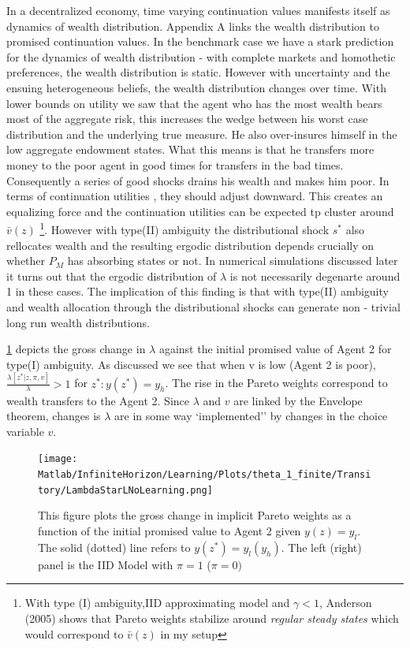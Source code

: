 \documentclass[12pt]{article}
\begin{document}
\noindent In a decentralized economy, time varying continuation values manifests itself as dynamics of wealth distribution. Appendix A links the wealth distribution to promised continuation values. In the benchmark case we have a stark prediction for the dynamics of wealth distribution - with complete markets and homothetic preferences, the wealth distribution is static. However with uncertainty and the ensuing heterogeneous beliefs, the wealth distribution changes over time. With lower bounds on utility we saw that the agent who has the most wealth bears most of the aggregate risk, this increases the wedge between his worst case distribution and the underlying true measure. He also over-insures himself in the low aggregate endowment states. What this means is that he transfers more money to the poor agent in good times for transfers in the bad times. Consequently a series of good shocks drains his wealth and makes him poor. In terms of continuation utilities , they should adjust downward. This creates an 
equalizing force and the continuation utilities can be expected tp cluster around $\bar{v}(z)$ \footnote{With type (I) ambiguity,IID approximating model and $\gamma <1$, Anderson (2005) shows that Pareto weights stabilize around \emph{regular steady states} which would correspond to $\bar{v}(z)$ in my setup}. However with type(II) ambiguity the distributional shock $s^*$ also rellocates wealth and the resulting ergodic distribution depends crucially on whether $P_M$ has absorbing states or not. In numerical simulations discussed later it turns out that the ergodic distribution of $\lambda$ is not necessarily degenarte around 1 in these cases. The implication of this finding is that with type(II) ambiguity and wealth allocation through the distributional shocks can generate non - trivial long run wealth distributions. 


\noindent \ref{fig:LambdaStarLStarNoLearning} depicts the gross change in $\lambda$ against the initial promised value of Agent 2 for type(I) ambiguity.  As discussed we see that when v is low (Agent 2 is poor), $\frac{\lambda[z^*|z,\pi,v]}{\lambda} > 1$ for $z^* : y(z^*)=y_h$. The rise in the Pareto weights correspond to wealth transfers to the Agent 2. Since $\lambda$ and $v$ are linked by the Envelope theorem, changes is $\lambda$ are in some way `implemented'' by changes in the choice variable $v$.
\begin{figure}[htbp]
\centering
	  \texttt{[image: Matlab/InfiniteHorizon/Learning/Plots/theta\_1\_finite/Transitory/LambdaStarLNoLearning.png]}

	\caption{This figure plots the gross change in implicit Pareto weights as a function 
of the initial promised value to Agent 2 given $y(z)=y_l$. The solid (dotted) line refers to
 $y(z^*)=y_l (y_h)$. The left (right) panel is the IID Model with $\pi=1$ ($\pi=0)$}
	\label{fig:LambdaStarLStarNoLearning}
\end{figure} 
\end{document}
